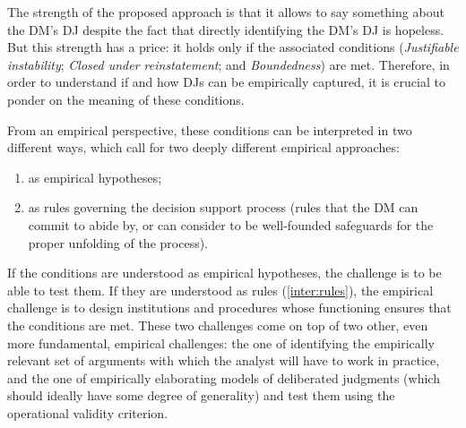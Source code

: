 \documentclass[version=3.21, pagesize, twoside=off, bibliography=totoc, DIV=calc, fontsize=12pt, a4paper, french, english]{scrartcl}
\begin{document}
The strength of the proposed approach is that it allows to say something about the \ac{DM}’s \ac{DJ} despite the fact that directly identifying the \ac{DM}’s \ac{DJ} is hopeless. 
But this strength has a price: it holds only if the associated conditions (\emph{Justifiable instability}; \emph{Closed under reinstatement}; and \emph{Boundedness}) are met. 
Therefore, in order to understand if and how \acp{DJ} can be empirically captured, it is crucial to ponder on the meaning of these conditions.


From an empirical perspective, these conditions can be interpreted in two different ways, which call for two deeply different empirical approaches:
\begin{enumerate}[label=\emph{\roman*}, ref=\emph{\roman*}]
		\item \label{inter:empir} as empirical hypotheses;
	\item \label{inter:rules} as rules governing the decision support process (rules that the \ac{DM} can commit to abide by, or can consider to be well-founded safeguards for the proper unfolding of the process).
\end{enumerate}

If the conditions are understood as empirical hypotheses, the challenge is to be able to test them. If they are understood as rules (\ref{inter:rules}), the empirical challenge is to design institutions and procedures whose functioning ensures that the conditions are met. These two challenges come on top of two other, even more fundamental, empirical challenges: the one of identifying the empirically relevant set of arguments with which the analyst will have to work in practice, and the one of empirically elaborating models of deliberated judgments (which should ideally have some degree of generality)  and test them using the operational validity criterion.
\end{document}
